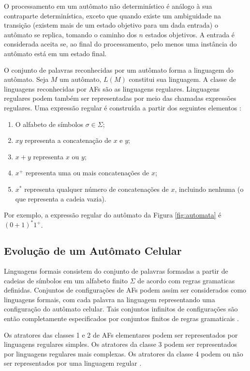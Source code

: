 \documentclass[12pt,a4paper]{article}
\begin{document}
O processamento em um autômato não determinístico é análogo à sua contraparte
determinística, exceto que quando existe um ambiguidade na transição (existem
mais de um estado objetivo para um dada entrada) o autômato se replica, tomando
o caminho dos $n$ estados objetivos. A entrada é considerada aceita se, ao
final do processamento, pelo menos uma instância do autômato está em um
estado final.

O conjunto de palavras reconhecidas por um autômato forma a linguagem do
autômato. Seja $M$ um autômato, $L(M)$ constitui sua linguagem. A classe
de linguagens reconhecidas por AFs são as linguagens regulares.
Linguagens regulares podem também ser representadas por meio das chamadas
expressões regulares. Uma expressão regular é construída a partir dos
seguintes elementos :

\begin{enumerate}
\item O alfabeto de símbolos $\sigma \in \Sigma$;
\item $xy$ representa a concatenação de $x$ e $y$;
\item $x+y$ representa $x$ ou $y$;
\item $x^+$ representa uma ou mais concatenações de $x$;
\item $x^*$ representa qualquer número de concatenações de $x$, incluindo
nenhuma (o que representa a cadeia vazia).
\end{enumerate}

Por exemplo, a expressão regular do autômato da Figura \ref{fig:automata}
é $(0+1)^*1^+$.

\subsection{Evolução de um Autômato Celular}

Linguagens formais consistem do conjunto de palavras formadas a partir de
cadeias de símbolos em um alfabeto finito $\Sigma$ de acordo com regras
gramaticas definidas. Conjuntos de configurações de AFs
podem assim ser considerados como linguagens formais, com cada palavra na
linguagem representando uma configuração do autômato celular. Tais conjuntos
infinitos de configurações são então completamente especificados por
conjuntos finitos de regras gramaticais .

Os atratores das classes 1 e 2 de AFs elementares podem ser
representados por linguagens regulares simples. Os atratores da classe 3 podem
ser representados por linguagens regulares mais complexas. Os atratores da
classe 4 podem ou não ser representados por uma linguagem regular .
\end{document}
